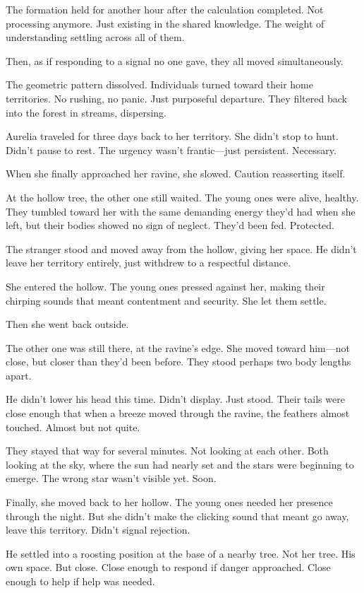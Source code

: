 The formation held for another hour after the calculation completed. Not processing anymore. Just existing in the shared knowledge. The weight of understanding settling across all of them.

Then, as if responding to a signal no one gave, they all moved simultaneously.

The geometric pattern dissolved. Individuals turned toward their home territories. No rushing, no panic. Just purposeful departure. They filtered back into the forest in streams, dispersing.

Aurelia traveled for three days back to her territory. She didn't stop to hunt. Didn't pause to rest. The urgency wasn't frantic—just persistent. Necessary.

When she finally approached her ravine, she slowed. Caution reasserting itself.

At the hollow tree, the other one still waited. The young ones were alive, healthy. They tumbled toward her with the same demanding energy they'd had when she left, but their bodies showed no sign of neglect. They'd been fed. Protected.

The stranger stood and moved away from the hollow, giving her space. He didn't leave her territory entirely, just withdrew to a respectful distance.

She entered the hollow. The young ones pressed against her, making their chirping sounds that meant contentment and security. She let them settle.

Then she went back outside.

The other one was still there, at the ravine's edge. She moved toward him—not close, but closer than they'd been before. They stood perhaps two body lengths apart.

He didn't lower his head this time. Didn't display. Just stood. Their tails were close enough that when a breeze moved through the ravine, the feathers almost touched. Almost but not quite.

They stayed that way for several minutes. Not looking at each other. Both looking at the sky, where the sun had nearly set and the stars were beginning to emerge. The wrong star wasn't visible yet. Soon.

Finally, she moved back to her hollow. The young ones needed her presence through the night. But she didn't make the clicking sound that meant go away, leave this territory. Didn't signal rejection.

He settled into a roosting position at the base of a nearby tree. Not her tree. His own space. But close. Close enough to respond if danger approached. Close enough to help if help was needed.

